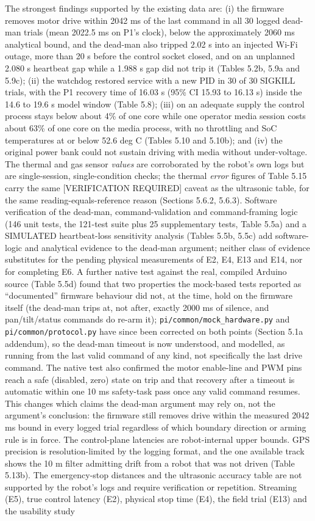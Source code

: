 The strongest findings supported by the existing data are: (i) the firmware removes motor drive within 2042 ms of the last command in all 30 logged dead-man trials (mean 2022.5 ms on P1's clock), below the approximately 2060 ms analytical bound, and the dead-man also tripped 2.02 s into an injected Wi-Fi outage, more than 20 s before the control socket closed, and on an unplanned 2.080 s heartbeat gap while a 1.988 s gap did not trip it (Tables 5.2b, 5.9a and 5.9c); (ii) the watchdog restored service with a new PID in 30 of 30 SIGKILL trials, with the P1 recovery time of 16.03 s (95\% CI 15.93 to 16.13 s) inside the 14.6 to 19.6 s model window (Table 5.8); (iii) on an adequate supply the control process stays below about 4\% of one core while one operator media session costs about 63\% of one core on the media process, with no throttling and SoC temperatures at or below 52.6 deg C (Tables 5.10 and 5.10b); and (iv) the original power bank could not sustain driving with media without under-voltage. The thermal and gas sensor \textit{values} are corroborated by the robot's own logs but are single-session, single-condition checks; the thermal \textit{error} figures of Table 5.15 carry the same [VERIFICATION REQUIRED] caveat as the ultrasonic table, for the same reading-equals-reference reason (Sections 5.6.2, 5.6.3). Software verification of the dead-man, command-validation and command-framing logic (146 unit tests, the 121-test suite plus 25 supplementary tests, Table 5.5a) and a SIMULATED heartbeat-loss sensitivity analysis (Tables 5.5b, 5.5c) add software-logic and analytical evidence to the dead-man argument; neither class of evidence substitutes for the pending physical measurements of E2, E4, E13 and E14, nor for completing E6. A further native test against the real, compiled Arduino source (Table 5.5d) found that two properties the mock-based tests reported as ``documented'' firmware behaviour did not, at the time, hold on the firmware itself (the dead-man trips at, not after, exactly 2000 ms of silence, and pan/tilt/status commands do re-arm it); \texttt{pi/common/mock\_hardware.py} and \texttt{pi/common/protocol.py} have since been corrected on both points (Section 5.1a addendum), so the dead-man timeout is now understood, and modelled, as running from the last valid command of any kind, not specifically the last drive command. The native test also confirmed the motor enable-line and PWM pins reach a safe (disabled, zero) state on trip and that recovery after a timeout is automatic within one 10 ms safety-task pass once any valid command resumes. This changes which claims the dead-man argument may rely on, not the argument's conclusion: the firmware still removes drive within the measured 2042 ms bound in every logged trial regardless of which boundary direction or arming rule is in force. The control-plane latencies are robot-internal upper bounds. GPS precision is resolution-limited by the logging format, and the one available track shows the 10 m filter admitting drift from a robot that was not driven (Table 5.13b). The emergency-stop distances and the ultrasonic accuracy table are not supported by the robot's logs and require verification or repetition. Streaming (E5), true control latency (E2), physical stop time (E4), the field trial (E13) and the usability study 